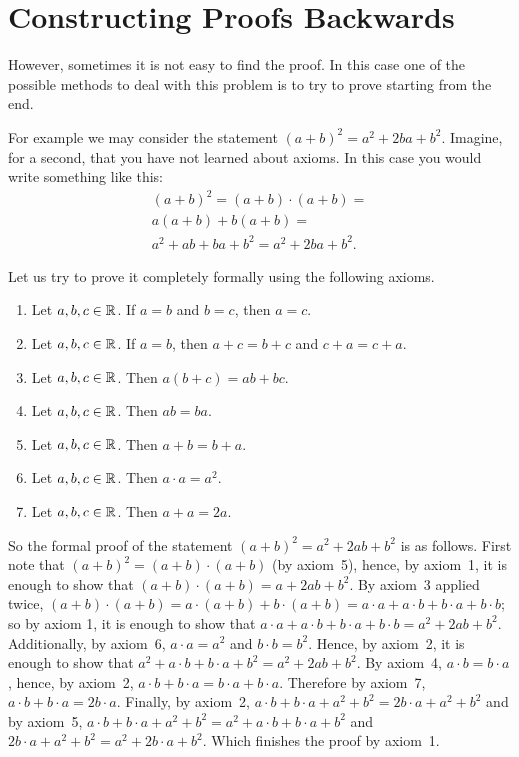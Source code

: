 \section{Constructing Proofs Backwards}
However, sometimes it is not easy to find the proof. In this case one of the
possible methods to deal with this problem is to try to prove starting from
the end.

For example we may consider the statement $(a + b)^2 = a^2 + 2ba + b^2$.
Imagine, for a second, that you have not learned about axioms.
In this case you would write something like this:
\begin{multline*}
    (a + b)^2 = (a + b) \cdot (a + b) = \\
    a (a + b) + b (a + b) = \\
    a^2 + ab + ba + b^2 = a^2 + 2ba + b^2.
\end{multline*}

Let us try to prove it completely formally using the following axioms.
\begin{enumerate}
  \item Let $a, b, c \in \mathbb{R}$. If $a = b$ and $b = c$, then $a = c$.
  \item Let $a, b, c \in \mathbb{R}$. If $a = b$, then $a + c = b + c$ and
    $c + a = c + a$.
  \item Let $a, b, c \in \mathbb{R}$. Then $a (b + c) = ab + bc$.
  \item Let $a, b, c \in \mathbb{R}$. Then $ab = ba$.
  \item Let $a, b, c \in \mathbb{R}$. Then $a + b = b + a$.
  \item Let $a, b, c \in \mathbb{R}$. Then $a \cdot a = a^2$.
  \item Let $a, b, c \in \mathbb{R}$. Then $a + a = 2a$.
\end{enumerate}
So the formal proof of the statement $(a + b)^2 = a^2 + 2ab + b^2$ is as
follows. First note that $(a + b)^2 = (a + b) \cdot (a + b)$ (by axiom~5),
hence, by axiom~1, it is enough to show that
$(a + b) \cdot (a + b) = a + 2ab + b^2$. By axiom~3 applied twice,
$(a + b) \cdot (a + b) = a \cdot (a + b) + b \cdot (a + b) =
a \cdot a + a \cdot b + b \cdot a + b \cdot b$; so by axiom 1, it is enough
to show that $a \cdot a + a \cdot b + b \cdot a + b \cdot b = a^2 + 2ab + b^2$.
Additionally, by axiom~6, $a \cdot a = a^2$ and $b \cdot b = b^2$. Hence, by
axiom~2, it is enough to show that
$a^2 + a \cdot b + b \cdot a + b^2 = a^2 + 2ab + b^2$. By axiom~4,
$a \cdot b = b \cdot a$, hence, by axiom~2,
$a \cdot b + b \cdot a = b \cdot a + b \cdot a$. Therefore by axiom~7,
$a \cdot b + b \cdot a = 2 b \cdot a$. Finally, by axiom~2,
$a \cdot b + b \cdot a + a^2 + b^2 = 2b \cdot a + a^2 + b^2$ and by axiom~5,
$a \cdot b + b \cdot a + a^2 + b^2 = a^2 + a \cdot b + b \cdot a + b^2$ and
$2b \cdot a + a^2 + b^2 =  a^2 + 2b \cdot a + b^2$. Which finishes the proof by
axiom~1.

